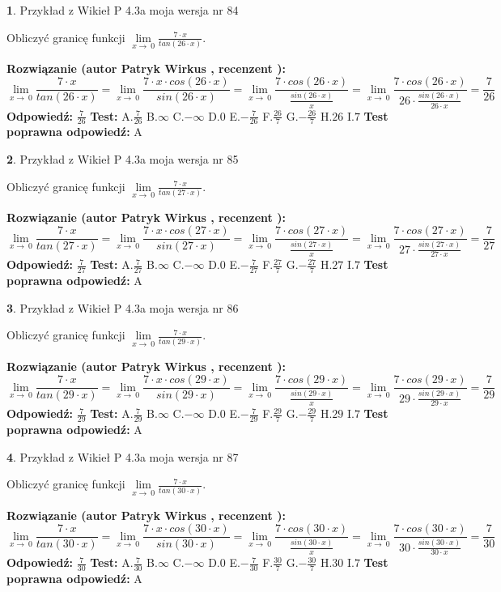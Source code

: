\documentclass[12pt, a4paper]{article}
\theoremstyle{definition} %
\newtheorem{zad}{}
\newcommand{\zadStart}[1]{\begin{zad}#1\newline}
\newcommand{\zadStop}{\end{zad}}
\newcommand{\rozwStart}[2]{\noindent \textbf{Rozwiązanie (autor #1 , recenzent #2): }\newline}
\newcommand{\rozwStop}{\newline}
\newcommand{\odpStart}{\noindent \textbf{Odpowiedź:}\newline}
\newcommand{\odpStop}{\newline}
\newcommand{\testStart}{\noindent \textbf{Test:}\newline}
\newcommand{\testStop}{\newline}
\newcommand{\kluczStart}{\noindent \textbf{Test poprawna odpowiedź:}\newline}
\newcommand{\kluczStop}{\newline}
\begin{document}
\zadStart{Przykład z Wikieł P 4.3a moja wersja nr 84}


Obliczyć granicę funkcji $\lim\limits_{x\to\ 0}\frac{7 \cdot x}{tan(26 \cdot x)}$.
\zadStop
\rozwStart{Patryk Wirkus}{}
$$\lim\limits_{x\to\ 0}\frac{7 \cdot x}{tan(26 \cdot x)}=\lim\limits_{x\to\ 0}\frac{7 \cdot x \cdot cos(26 \cdot x)}{sin(26 \cdot x)}=\lim\limits_{x\to\ 0}\frac{7 \cdot cos(26 \cdot x)}{\frac{sin(26 \cdot x)}{x}}=\lim\limits_{x\to\ 0}\frac{7 \cdot cos(26 \cdot x)}{26 \cdot \frac{sin(26 \cdot x)}{26 \cdot x}} = \frac{7}{26}$$
\rozwStop
\odpStart
$\frac{7}{26}$
\odpStop
\testStart
A.$\frac{7}{26}$
B.$\infty$
C.$-\infty$
D.$0$
E.$-\frac{7}{26}$
F.$\frac{26}{7}$
G.$-\frac{26}{7}$
H.$26$
I.$7$
\testStop
\kluczStart
A
\kluczStop



\zadStart{Przykład z Wikieł P 4.3a moja wersja nr 85}


Obliczyć granicę funkcji $\lim\limits_{x\to\ 0}\frac{7 \cdot x}{tan(27 \cdot x)}$.
\zadStop
\rozwStart{Patryk Wirkus}{}
$$\lim\limits_{x\to\ 0}\frac{7 \cdot x}{tan(27 \cdot x)}=\lim\limits_{x\to\ 0}\frac{7 \cdot x \cdot cos(27 \cdot x)}{sin(27 \cdot x)}=\lim\limits_{x\to\ 0}\frac{7 \cdot cos(27 \cdot x)}{\frac{sin(27 \cdot x)}{x}}=\lim\limits_{x\to\ 0}\frac{7 \cdot cos(27 \cdot x)}{27 \cdot \frac{sin(27 \cdot x)}{27 \cdot x}} = \frac{7}{27}$$
\rozwStop
\odpStart
$\frac{7}{27}$
\odpStop
\testStart
A.$\frac{7}{27}$
B.$\infty$
C.$-\infty$
D.$0$
E.$-\frac{7}{27}$
F.$\frac{27}{7}$
G.$-\frac{27}{7}$
H.$27$
I.$7$
\testStop
\kluczStart
A
\kluczStop



\zadStart{Przykład z Wikieł P 4.3a moja wersja nr 86}


Obliczyć granicę funkcji $\lim\limits_{x\to\ 0}\frac{7 \cdot x}{tan(29 \cdot x)}$.
\zadStop
\rozwStart{Patryk Wirkus}{}
$$\lim\limits_{x\to\ 0}\frac{7 \cdot x}{tan(29 \cdot x)}=\lim\limits_{x\to\ 0}\frac{7 \cdot x \cdot cos(29 \cdot x)}{sin(29 \cdot x)}=\lim\limits_{x\to\ 0}\frac{7 \cdot cos(29 \cdot x)}{\frac{sin(29 \cdot x)}{x}}=\lim\limits_{x\to\ 0}\frac{7 \cdot cos(29 \cdot x)}{29 \cdot \frac{sin(29 \cdot x)}{29 \cdot x}} = \frac{7}{29}$$
\rozwStop
\odpStart
$\frac{7}{29}$
\odpStop
\testStart
A.$\frac{7}{29}$
B.$\infty$
C.$-\infty$
D.$0$
E.$-\frac{7}{29}$
F.$\frac{29}{7}$
G.$-\frac{29}{7}$
H.$29$
I.$7$
\testStop
\kluczStart
A
\kluczStop



\zadStart{Przykład z Wikieł P 4.3a moja wersja nr 87}


Obliczyć granicę funkcji $\lim\limits_{x\to\ 0}\frac{7 \cdot x}{tan(30 \cdot x)}$.
\zadStop
\rozwStart{Patryk Wirkus}{}
$$\lim\limits_{x\to\ 0}\frac{7 \cdot x}{tan(30 \cdot x)}=\lim\limits_{x\to\ 0}\frac{7 \cdot x \cdot cos(30 \cdot x)}{sin(30 \cdot x)}=\lim\limits_{x\to\ 0}\frac{7 \cdot cos(30 \cdot x)}{\frac{sin(30 \cdot x)}{x}}=\lim\limits_{x\to\ 0}\frac{7 \cdot cos(30 \cdot x)}{30 \cdot \frac{sin(30 \cdot x)}{30 \cdot x}} = \frac{7}{30}$$
\rozwStop
\odpStart
$\frac{7}{30}$
\odpStop
\testStart
A.$\frac{7}{30}$
B.$\infty$
C.$-\infty$
D.$0$
E.$-\frac{7}{30}$
F.$\frac{30}{7}$
G.$-\frac{30}{7}$
H.$30$
I.$7$
\testStop
\kluczStart
A
\kluczStop
\end{document}
